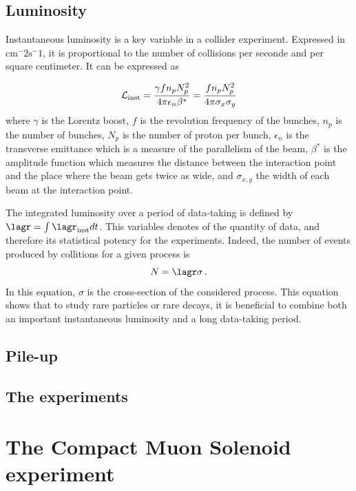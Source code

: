 \subsection{Luminosity}

Instantaneous luminosity is a key variable in a collider experiment. Expressed in $\mathrm{cm^-2 s^-1}$, it is proportional to the number of collisions per seconde and per square centimeter. It can be expressed as

\begin{equation}
    \mathcal{L}_{\rm{inst}} = \frac{\gamma f n_p N_p^2}{4\pi \epsilon_n \beta^{*}} = \frac{f n_p N_p^2}{4\pi \sigma_x \sigma_y}
\end{equation}
where $\gamma$ is the Lorentz boost, $f$ is the revolution frequency of the bunches, $n_p$ is the number of bunches, $N_p$ is the number of proton per bunch, $\epsilon_n$ is the transverse emittance which is a measure of the parallelism of the beam, $\beta^*$ is the amplitude function which measures the distance between the interaction point and the place where the beam gets twice as wide, and $\sigma_{x,y}$ the width of each beam at the interaction point.

The integrated luminosity over a period of data-taking is defined by $\lagr = \int \lagr_{\rm{inst}} dt$. This variables denotes of the quantity of data, and therefore its statistical potency for the experiments. Indeed, the number of events produced by collitions for a given process is 
\begin{equation}
    N = \lagr\sigma \mend
\end{equation}
In this equation, $\sigma$ is the cross-section of the considered process. This equation shows that to study rare particles or rare decays, it is beneficial to combine both an important instantaneous luminosity and a long data-taking period.

\subsection{Pile-up}


\subsection{The experiments}

\section{The Compact Muon Solenoid experiment}
\label{sec:detectors}
